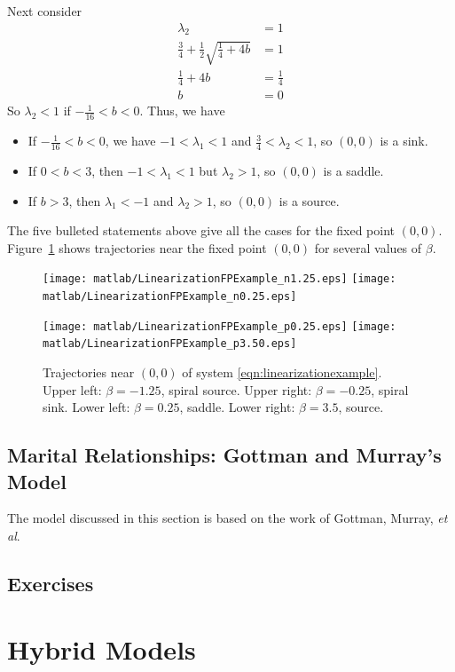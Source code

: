 \documentclass[reqno]{immbook}
\begin{document}
Next consider
\begin{equation}
\begin{split}
   \lambda_2 & = 1 \\
   \frac{3}{4} + \frac{1}{2} \sqrt{\frac{1}{4}+4b} & = 1 \\
   \frac{1}{4}+4b & = \frac{1}{4} \\
   b & = 0
\end{split}
\end{equation}
So $\lambda_2 < 1$ if $-\frac{1}{16} < b < 0$.
Thus, we have
\begin{itemize}
\item
If $-\frac{1}{16} < b < 0$, we have $-1 < \lambda_1 < 1$ and $\frac{3}{4} < \lambda_2 < 1$, so
$(0,0)$ is a sink.
\item
If $0 < b < 3$, then $-1 < \lambda_1 < 1$ but $\lambda_2 > 1$, so 
$(0,0)$ is a saddle.
\item
If $b > 3$, then $\lambda_1 < -1$ and $\lambda_2 > 1$, so
$(0,0)$ is a source.
\end{itemize}
The five bulleted statements above give all the cases for the
fixed point $(0,0)$.
Figure~\ref{fig:LinearizationFPExamples} shows trajectories
near the fixed point $(0,0)$ for several values of $\beta$.
\begin{figure}
\centerline{%
\texttt{[image: matlab/LinearizationFPExample\_n1.25.eps]}
\texttt{[image: matlab/LinearizationFPExample\_n0.25.eps]}
}
\centerline{%
\texttt{[image: matlab/LinearizationFPExample\_p0.25.eps]}
\texttt{[image: matlab/LinearizationFPExample\_p3.50.eps]}
}
\caption{Trajectories near $(0,0)$ of system
\eqref{eqn:linearizationexample}. Upper left: $\beta=-1.25$, spiral source.
Upper right: $\beta=-0.25$, spiral sink.
Lower left: $\beta=0.25$, saddle.
Lower right: $\beta=3.5$, source.}
\label{fig:LinearizationFPExamples}
\end{figure}


\section{Marital Relationships: Gottman and Murray's Model}
The model discussed in this section is based on the
work of Gottman, Murray, \emph{et al}\cite{GM}.
\section{Exercises}
%
%
%
\chapter{Hybrid Models}
\end{document}
